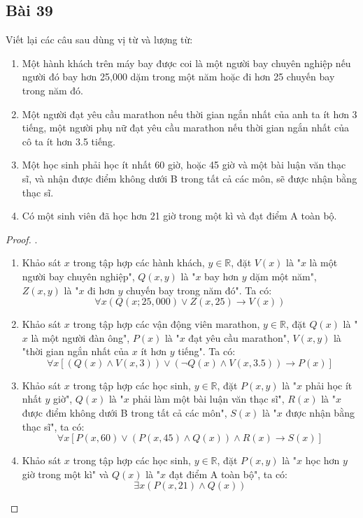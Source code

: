 \subsection*{Bài 39}
Viết lại các câu sau dùng vị từ và lượng từ:
\begin{enumerate}[label=\alph*)]
    \item Một hành khách trên máy bay được coi là một người bay chuyên nghiệp nếu người đó bay hơn 25,000 dặm trong một năm hoặc đi hơn 25 chuyến bay trong năm đó.
    \item Một người đạt yêu cầu marathon nếu thời gian ngắn nhất của anh ta ít hơn 3 tiếng, một người phụ nữ đạt yêu cầu marathon nếu thời gian ngắn nhất của cô ta ít hơn 3.5 tiếng.
    \item Một học sinh phải học ít nhất 60 giờ, hoặc 45 giờ và một bài luận văn thạc sĩ, và nhận được điểm không dưới B trong tất cả các môn, sẽ được nhận bằng thạc sĩ.
    \item Có một sinh viên đã học hơn 21 giờ trong một kì và đạt điểm A toàn bộ.
\end{enumerate}
\begin{proof}.
    \begin{enumerate}[label=\alph*)]
        \item Khảo sát $x$ trong tập hợp các hành khách, $y\in\mathbb{R}$, đặt $V(x)$ là "$x$ là một người bay chuyên nghiệp", $Q(x, y)$ là "$x$ bay hơn $y$ dặm một năm", $Z(x, y)$ là "$x$ đi hơn $y$ chuyến bay trong năm đó". Ta có: $$\forall x(Q(x;25,000)\lor Z(x,25)\rightarrow V(x))$$
        \item Khảo sát $x$ trong tập hợp các vận động viên marathon, $y\in\mathbb{R}$, đặt $Q(x)$ là "$x$ là một người đàn ông", $P(x)$ là "$x$ đạt yêu cầu marathon", $V(x,y)$ là "thời gian ngắn nhất của $x$ ít hơn $y$ tiếng". Ta có: $$\forall x[(Q(x)\land V(x,3))\lor (\neg Q(x)\land V(x,3.5))\rightarrow P(x)]$$
        \item Khảo sát $x$ trong tập hợp các học sinh, $y\in\mathbb{R}$, đặt $P(x,y)$ là "$x$ phải học ít nhất $y$ giờ", $Q(x)$ là "$x$ phải làm một bài luận văn thạc sĩ", $R(x)$ là "$x$ được điểm không dưới B trong tất cả các môn", $S(x)$ là "$x$ được nhận bằng thạc sĩ", ta có: $$\forall x[P(x,60)\lor (P(x,45)\land Q(x))\land R(x)\rightarrow S(x)]$$
        \item Khảo sát $x$ trong tập hợp các học sinh, $y\in\mathbb{R}$, đặt $P(x,y)$ là "$x$ học hơn $y$ giờ trong một kì" và $Q(x)$ là "$x$ đạt điểm A toàn bộ", ta có: $$\exists x(P(x,21)\land Q(x))$$
    \end{enumerate}
\end{proof}
